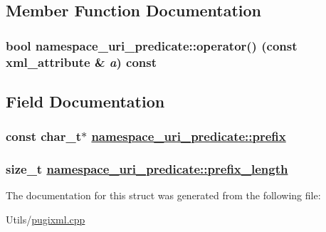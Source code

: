 \subsection{Member Function Documentation}
\hypertarget{structnamespace__uri__predicate_b4580e45d603d3eedfe75fec74210ce1}{
\subsubsection[operator()]{\setlength{\rightskip}{0pt plus 5cm}bool namespace\_\-uri\_\-predicate::operator() (const xml\_\-attribute \& {\em a}) const}}
\label{structnamespace__uri__predicate_b4580e45d603d3eedfe75fec74210ce1}




\subsection{Field Documentation}
\hypertarget{structnamespace__uri__predicate_80a2c051b9e57b8895c28d8fcc32e051}{
\subsubsection[prefix]{\setlength{\rightskip}{0pt plus 5cm}const char\_\-t$\ast$ \hyperlink{structnamespace__uri__predicate_80a2c051b9e57b8895c28d8fcc32e051}{namespace\_\-uri\_\-predicate::prefix}}}
\label{structnamespace__uri__predicate_80a2c051b9e57b8895c28d8fcc32e051}


\hypertarget{structnamespace__uri__predicate_a48279192e8d48b9c798f5485a2a9170}{
\subsubsection[prefix\_\-length]{\setlength{\rightskip}{0pt plus 5cm}size\_\-t \hyperlink{structnamespace__uri__predicate_a48279192e8d48b9c798f5485a2a9170}{namespace\_\-uri\_\-predicate::prefix\_\-length}}}
\label{structnamespace__uri__predicate_a48279192e8d48b9c798f5485a2a9170}




The documentation for this struct was generated from the following file:\begin{CompactItemize}
\item 
Utils/\hyperlink{pugixml_8cpp}{pugixml.cpp}\end{CompactItemize}
